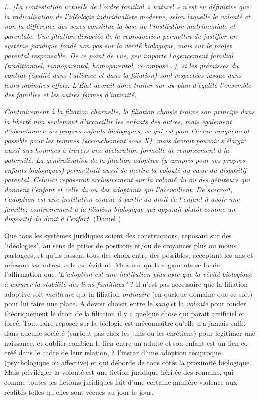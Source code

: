 \begin{displayquote}
{\emph{[...]La contestation actuelle de l'ordre familial « naturel » n'est en définitive que la radicalisation de l'idéologie individualiste moderne, selon laquelle la volonté et non la différence des sexes constitue la base de l'institution matrimoniale et parentale. Une filiation dissociée de la reproduction permettra de justifier un système juridique fondé non pas sur la vérité biologique, mais sur le projet parental responsable. De ce point de vue, peu importe l'agencement familial (traditionnel, monoparental, homoparental, recomposé...), si les prémisses du contrat (égalité dans l'alliance et dans la filiation) sont respectées jusque dans leurs moindres effets. L'État devrait donc traiter sur un plan d'égalité l'ensemble des familles et les autres formes d'intimité.}

\emph{Contrairement à la filiation charnelle, la filiation choisie trouve son principe dans la liberté non seulement d'accueillir les enfants des autres, mais également d'abandonner ses propres enfants biologiques, ce qui est pour l'heure uniquement possible pour les femmes (accouchement sous X), mais devrait pouvoir s'élargir aussi aux hommes à travers une déclaration formelle de renoncement à la paternité. La généralisation de la filiation adoptive (y compris pour ses propres enfants biologiques) permettrait aussi de mettre la volonté au cœur du dispositif parental. Celui-ci reposerait exclusivement sur la volonté du ou des géniteurs qui donnent l'enfant et celle du ou des adoptants qui l'accueillent. De surcroît, l'adoption est une institution conçue à partir du droit de l'enfant à avoir une famille, contrairement à la filiation biologique qui apparaît plutôt comme un dispositif du droit à l'enfant}. (Daniel )}\end{displayquote}


 
 Que tous les systèmes juridiques soient des constructions, reposant sur des "idéologies", au sens de prises de positions et/ou de croyances plus ou moins partagées, et qu'ils fassent tous des choix entre des possibles, acceptant les uns et refusant les autres, cela est évident. Mais sur quels arguments se fonde l'affirmation que
 \emph{"L'adoption est une institution plus apte que la vérité biologique à assurer la stabilité des liens familiaux"} ?  Il n'est pas nécessaire que la filiation adoptive soit \emph{meilleure} que la filiation \emph{ordinaire} (en quelque domaine que ce soit) pour lui faire une place.  A devoir choisir entre le \emph{sang} et la \emph{volonté} pour fonder théoriquement le droit de la filiation il y a quelque chose qui parait artificiel et forcé.  Tout faire reposer sur la biologie est méconnaître qu'elle n'a jamais suffit dans aucune société (surtout pas chez les juifs ou les chrétiens) pour légitimer une naissance, et oublier combien le lien entre un adulte et son enfant est un lien co-créé dans le cadre de leur relation, à l'instar d'une adoption réciproque (psychologique ou affective) et qui déborde de tous côtés la proximité biologique. Mais privilégier la volonté est une fiction juridique héritée des romains, qui comme toutes les fictions juridiques fait d'une certaine manière violence aux réalités telles qu'elles sont vécues au jour le jour.
 
